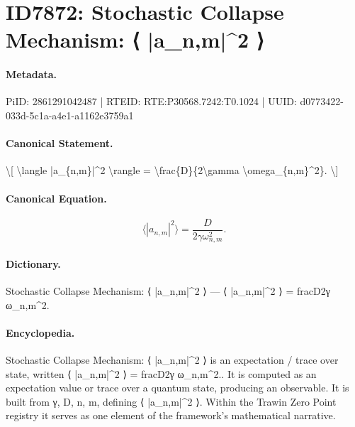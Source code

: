 \section*{ID7872: Stochastic Collapse Mechanism: ⟨ |a\_n,m|\textasciicircum{}2 ⟩}
\paragraph{Metadata.}
PiID: 2861291042487 | RTEID: RTE:P30568.7242:T0.1024 | UUID: d0773422-033d-5c1a-a4e1-a1162e3759a1

\paragraph{Canonical Statement.}
\textbackslash{}[ \textbackslash{}langle |a\_\{n,m\}|\textasciicircum{}2 \textbackslash{}rangle = \textbackslash{}frac\{D\}\{2\textbackslash{}gamma \textbackslash{}omega\_\{n,m\}\textasciicircum{}2\}. \textbackslash{}]

\paragraph{Canonical Equation.}
\[
\langle |a_{n,m}|^2 \rangle = \frac{D}{2\gamma \omega_{n,m}^2}.
\]

\paragraph{Dictionary.}
Stochastic Collapse Mechanism: ⟨ |a\_n,m|\textasciicircum{}2 ⟩ — ⟨ |a\_n,m|\textasciicircum{}2 ⟩ = fracD2γ ω\_n,m\textasciicircum{}2.

\paragraph{Encyclopedia.}
Stochastic Collapse Mechanism: ⟨ |a\_n,m|\textasciicircum{}2 ⟩ is an expectation / trace over state, written ⟨ |a\_n,m|\textasciicircum{}2 ⟩ = fracD2γ ω\_n,m\textasciicircum{}2.. It is computed as an expectation value or trace over a quantum state, producing an observable. It is built from γ, D, n, m, defining ⟨ |a\_n,m|\textasciicircum{}2 ⟩. Within the Trawin Zero Point registry it serves as one element of the framework's mathematical narrative.

